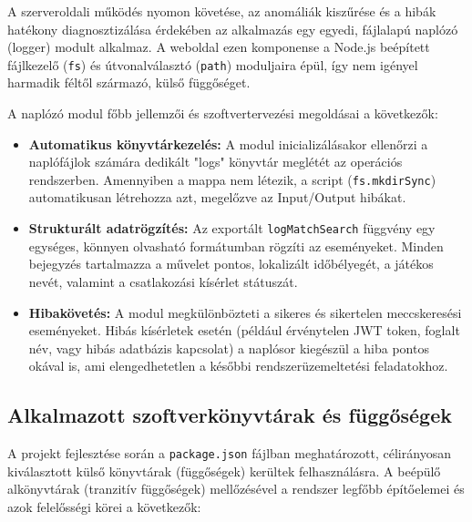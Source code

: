 A szerveroldali működés nyomon követése, az anomáliák kiszűrése és a hibák hatékony diagnosztizálása érdekében az alkalmazás egy egyedi, fájlalapú naplózó (logger) modult alkalmaz. A weboldal ezen komponense a Node.js beépített fájlkezelő (\texttt{fs}) és útvonalválasztó (\texttt{path}) moduljaira épül, így nem igényel harmadik féltől származó, külső függőséget.

A naplózó modul főbb jellemzői és szoftvertervezési megoldásai a következők:

\begin{itemize}
    \item \textbf{Automatikus könyvtárkezelés:} A modul inicializálásakor ellenőrzi a naplófájlok számára dedikált "logs" könyvtár meglétét az operációs rendszerben. Amennyiben a mappa nem létezik, a script (\texttt{fs.mkdirSync}) automatikusan létrehozza azt, megelőzve az Input/Output hibákat.
    
    \item \textbf{Strukturált adatrögzítés:} Az exportált \texttt{logMatchSearch} függvény egy egységes, könnyen olvasható formátumban rögzíti az eseményeket. Minden bejegyzés tartalmazza a művelet pontos, lokalizált időbélyegét, a játékos nevét, valamint a csatlakozási kísérlet státuszát.
    
    \item \textbf{Hibakövetés:} A modul megkülönbözteti a sikeres és sikertelen meccskeresési eseményeket. Hibás kísérletek esetén (például érvénytelen JWT token, foglalt név, vagy hibás adatbázis kapcsolat) a naplósor kiegészül a hiba pontos okával is, ami elengedhetetlen a későbbi rendszerüzemeltetési feladatokhoz.
\end{itemize}

\subsection{Alkalmazott szoftverkönyvtárak és függőségek}
\label{subsec:dependencies}

A projekt fejlesztése során a \texttt{package.json} fájlban meghatározott, célirányosan kiválasztott külső könyvtárak (függőségek) kerültek felhasználásra. A beépülő alkönyvtárak (tranzitív függőségek) mellőzésével a rendszer legfőbb építőelemei és azok felelősségi körei a következők:

